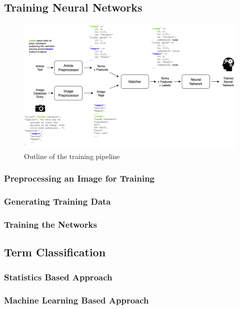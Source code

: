 \documentclass[11pt,a4paper,twoside]{article}
\begin{document}
\subsection{Training Neural Networks} \label{SystemTrain}

\begin{figure}[h]
  \includegraphics[width=\columnwidth]{picpic-training.png}
  \caption{Outline of the training pipeline}
  \label{fig:picpic-training}
\end{figure}

\subsubsection{Preprocessing an Image for Training} \label{SystemTrainPreprocess}
\subsubsection{Generating Training Data} \label{SystemTrainGenerate}
\subsubsection{Training the Networks} \label{SystemTrainTrain}

\subsection{Term Classification} \label{SystemClassification}
\subsubsection{Statistics Based Approach} \label{SystemClassificationStat}
\subsubsection{Machine Learning Based Approach} \label{SystemClassificationML}
\end{document}

